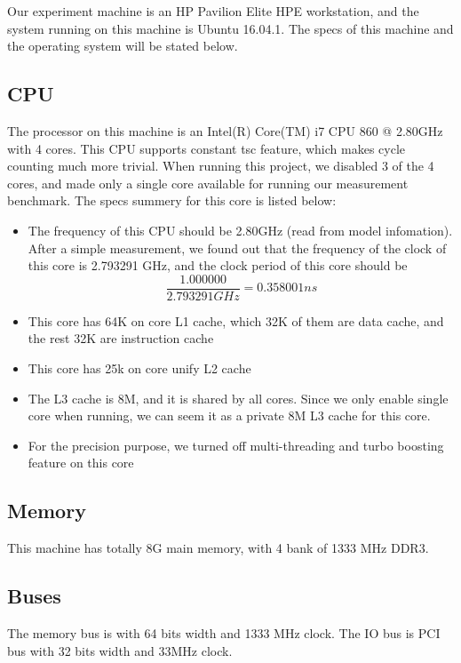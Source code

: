 Our experiment machine is an HP Pavilion Elite HPE workstation, and the system running on this machine is Ubuntu 16.04.1. The specs of this machine and the operating system will be stated below.

\subsection{CPU}

The processor on this machine is an Intel(R) Core(TM) i7 CPU 860 @ 2.80GHz with 4 cores. This CPU supports constant tsc feature, which makes cycle counting much more trivial. When running this project, we disabled 3 of the 4 cores, and made only a single core available for running our measurement benchmark. The specs summery for this core is listed below:

\begin{itemize}
    \item The frequency of this CPU should be 2.80GHz (read from model infomation). After a simple measurement, we found out that the frequency of the clock of this core is 2.793291 GHz, and the clock period of this core should be $$ \frac{1.000000}{2.793291 GHz} = 0.358001 ns $$
    \item This core has 64K on core L1 cache, which 32K of them are data cache, and the rest 32K are instruction cache
    \item This core has 25k on core unify L2 cache
    \item The L3 cache is 8M, and it is shared by all cores. Since we only enable single core when running, we can seem it as a private 8M L3 cache for this core.
    \item For the precision purpose, we turned off multi-threading and turbo boosting feature on this core
\end{itemize}

\subsection{Memory}

This machine has totally 8G main memory, with 4 bank of 1333 MHz DDR3.

\subsection{Buses}

The memory bus is with 64 bits width and 1333 MHz clock. The IO bus is PCI bus with 32 bits width and 33MHz clock.

